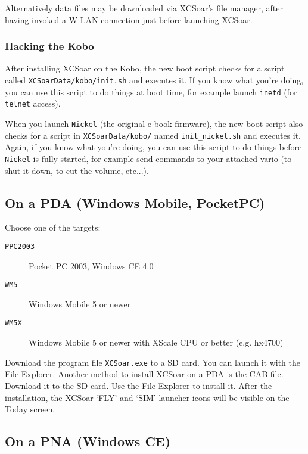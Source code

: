 Alternatively data files may be downloaded via XCSoar's file manager, after having invoked a W-LAN-connection just before launching XCSoar.  

\subsubsection{Hacking the Kobo}

After installing XCSoar on the Kobo, the new boot script checks for a
script called \texttt{XCSoarData/kobo/init.sh} and executes it.  If
you know what you're doing, you can use this script to do things at
boot time, for example launch \texttt{inetd} (for \texttt{telnet}
access).

When you launch \texttt{Nickel} (the original e-book firmware), the new
boot script also checks for a script in \texttt{XCSoarData/kobo/} named
\texttt{init\_nickel.sh} and executes it. Again, if
you know what you're doing, you can use this script to do things
before \texttt{Nickel} is fully started, for example send commands
to your attached vario (to shut it down, to cut the volume, etc...).

\subsection*{On a PDA (Windows Mobile, PocketPC)}

Choose one of the targets:

\begin{description}
\item[\texttt{PPC2003}] Pocket PC 2003, Windows CE 4.0
\item[\texttt{WM5}] Windows Mobile 5 or newer
\item[\texttt{WM5X}] Windows Mobile 5 or newer with XScale CPU or
  better (e.g. hx4700)
\end{description}

Download the program file \verb|XCSoar.exe| to a SD card.  You can
launch it with the File Explorer.
Another method to install XCSoar on a PDA is the CAB file.  Download
it to the SD card.  Use the File Explorer to install it.  After the
installation, the XCSoar `FLY' and `SIM' launcher icons will be
visible on the Today screen.


\subsection*{On a PNA (Windows CE)}

